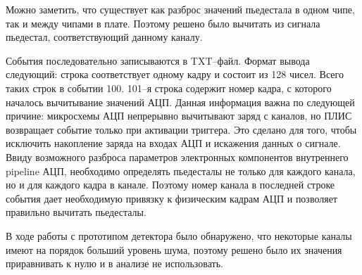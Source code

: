Можно заметить, что существует как разброс значений пьедестала в одном чипе, так и между чипами в плате. Поэтому решено было вычитать из сигнала пьедестал, соответствующий данному каналу.
\par События последовательно записываются в TXT--файл. Формат вывода следующий: строка соответствует одному кадру и состоит из 128 чисел. Всего таких строк в событии 100. 101--я строка содержит номер кадра, с которого началось вычитывание значений АЦП. Данная информация важна по следующей причине: микросхемы АЦП непрерывно вычитывают заряд с каналов, но ПЛИС возвращает событие только при активации триггера. Это сделано для того, чтобы исключить накопление заряда на входах АЦП и искажения данных о сигнале. Ввиду возможного разброса параметров электронных компонентов внутреннего pipeline АЦП, необходимо определять пьедесталы не только для каждого канала, но и для каждого кадра в канале. Поэтому номер канала в последней строке события дает необходимую привязку к физическим кадрам АЦП и позволяет правильно вычитать пьедесталы.
\par В ходе работы с прототипом детектора было обнаружено, что некоторые каналы имеют на порядок больший уровень шума, поэтому решено было их значения приравнивать к нулю и в анализе не использовать. 


